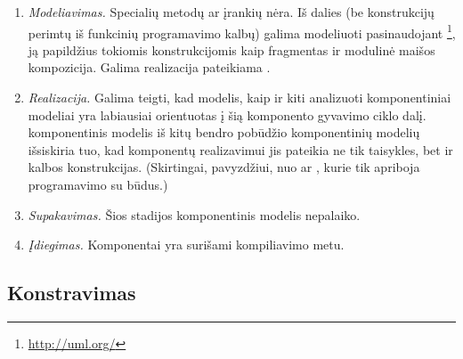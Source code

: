 \begin{enumerate}
  \item \emph{Modeliavimas.}
    Specialių metodų ar įrankių nėra. Iš dalies (be konstrukcijų
    perimtų iš funkcinių programavimo kalbų) galima modeliuoti
    pasinaudojant \footnote{\url{http://uml.org/}}, ją
    papildžius tokiomis konstrukcijomis kaip fragmentas ir
    modulinė maišos kompozicija. Galima realizacija pateikiama
    \cite[145]{rachimow2009scala}.
  \item \emph{Realizacija.}
    Galima teigti, kad  modelis, kaip ir kiti
    \cite{classification-framework-for-scm} analizuoti komponentiniai
    modeliai yra labiausiai orientuotas į šią komponento gyvavimo
    ciklo dalį.  komponentinis modelis iš kitų
    bendro pobūdžio komponentinių modelių išsiskiria tuo, kad
    komponentų realizavimui jis pateikia ne tik taisykles, bet ir
    kalbos konstrukcijas. (Skirtingai, pavyzdžiui, nuo 
    ar , kurie tik apriboja programavimo su
     būdus.)
  \item \emph{Supakavimas.}
    Šios stadijos  komponentinis modelis nepalaiko.
  \item \emph{Įdiegimas.}
    Komponentai yra surišami kompiliavimo metu.
\end{enumerate}

\subsection{Konstravimas}

